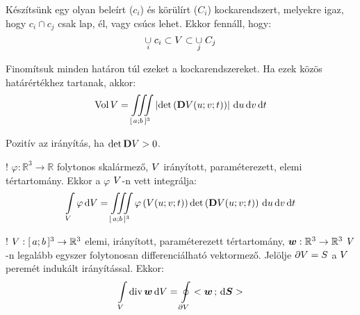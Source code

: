 \documentclass[main.tex]{subfiles}
\begin{document}

Készítsünk egy olyan beleírt ($c_i$) és körülírt ($C_i$)
kockarendszert, melyekre igaz, hogy $c_i \cap c_j$
csak lap, él, vagy csúcs lehet. Ekkor fennáll, hogy:
\begin{equation*}
  \underset{i}{\cup} \; c_i
  \subset {V} \subset
  \underset{j}{\cup} \; C_j
\end{equation*}

Finomítsuk minden határon túl ezeket a kockarendszereket.
Ha ezek közös határértékhez tartanak, akkor:
\begin{equation*}
  \operatorname{Vol} V = \iiint \limits_{[\, a; b \,]^3} \left|
  \det \left( \mathbf{D} {V}(u; v; t) \right)
  \right|
  \, \mathrm{d} u
  \, \mathrm{d} v
  \, \mathrm{d} t
\end{equation*}




Pozitív az irányítás, ha $\det \mathbf{D} {V} > 0$.




! $\varphi : \mathbb{R}^3 \rightarrow \mathbb{R}$ folytonos
skalármező, ${V}$ irányított, paraméterezett, elemi
tértartomány. Ekkor a $\varphi$ ${V}$-n vett integrálja:
\begin{equation*}
  \int \limits_{{V}} \varphi \, \mathrm{d} {V}
  =
  \iiint \limits_{[\, a; b \,]^3} \varphi \left(
  {V}(u; v; t)
  \right) \det \left(
  \mathbf{D} {V}(u; v; t)
  \right)
  \, \mathrm{d} u
  \, \mathrm{d} v
  \, \mathrm{d} t
\end{equation*}




! ${V} : [\, a; b \,]^3 \rightarrow \mathbb{R}^3$
elemi, irányított, paraméterezett tértartomány,
$\boldsymbol{w} : \mathbb{R}^3 \rightarrow \mathbb{R}^3$
${V}$-n legalább egyszer folytonosan differenciálható
vektormező. Jelölje $\partial {V} = {S}$
a ${V}$ peremét indukált irányítással. Ekkor:
\begin{equation*}
  \int \limits_{{V}} \operatorname{div} \boldsymbol{w} \, \mathrm{d} {V}
  =
  \oint \limits_{\partial {V}}
  < \boldsymbol{w} \, ; \, \mathrm{d} \boldsymbol{S} >
\end{equation*}
\end{document}
